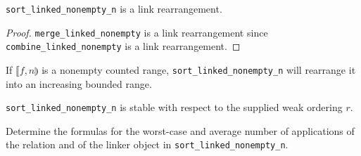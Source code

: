 \begin{lemma}
	\verb|sort_linked_nonempty_n| is a link rearrangement.
\end{lemma}

\begin{proof}
	\verb|merge_linked_nonempty| is a link rearrangement since \verb|combine_linked_nonempty| is a link
	rearrangement.
\end{proof}

\begin{lemma}
	If $\llbracket f, n \rrparenthesis$ is a nonempty counted range, \verb|sort_linked_nonempty_n| will
	rearrange it into an increasing bounded range.
\end{lemma}

\begin{lemma}
	\verb|sort_linked_nonempty_n| is stable with respect to the supplied weak ordering $r$.
\end{lemma}

\begin{exercise}
	Determine the formulas for the worst-case and average number of applications of the relation and of the
	linker object in \verb|sort_linked_nonempty_n|.
\end{exercise}
